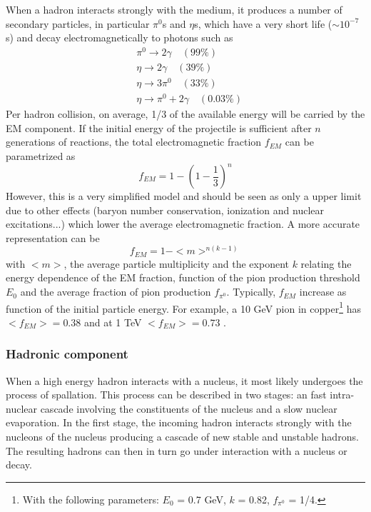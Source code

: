 When a hadron interacts strongly with the medium, it produces a number of secondary particles, in particular $\pi^0$s and $\eta$s, which have a very short life ($\sim 10^{-7}$s) and decay electromagnetically to photons such as
\begin{equation*}
  \begin{aligned}
    &\pi^0 \rightarrow 2\gamma \quad (99\%)\\
    &\eta \rightarrow 2\gamma \quad (39\%)\\
    &\eta \rightarrow 3\pi^0 \quad (33\%)\\
    &\eta \rightarrow \pi^0 + 2\gamma \quad (0.03\%)
  \end{aligned}
\end{equation*}
Per hadron collision, on average, 1/3 of the available energy will be carried by the EM component. If the initial energy of the projectile is sufficient after $n$ generations of reactions, the total electromagnetic fraction $f_{EM}$ can be parametrized as \cite{Wigmans:392793}
\begin{equation}
  f_{EM} = 1 - (1 - \frac{1}{3})^n
\end{equation}
However, this is a very simplified model and should be seen as only a upper limit due to other effects (baryon number conservation, ionization and nuclear excitations...) which lower the average electromagnetic fraction. A more accurate representation can be \cite{Wigmans:392793}
\begin{equation}
  f_{EM} = 1 - <m>^{n(k-1)}
\end{equation}
with $<m>$, the average particle multiplicity and the exponent $k$ relating the energy dependence of the EM fraction, function of the pion production threshold $E_0$ and the average fraction of pion production $f_{\pi^0}$. Typically, $f_{EM}$ increase as function of the initial particle energy. For example, a 10 GeV pion in copper\footnote{With the following parameters: $E_0$ = 0.7 GeV, $k$ = 0.82, $f_{\pi^0}$ = 1/4.} has $<f_{EM}> = 0.38$ and at 1 TeV $<f_{EM}> = 0.73$ \cite{Wigmans:392793}.

\subsubsection{Hadronic component}
\label{subsubsec:HadComp}

When a high energy hadron interacts with a nucleus, it most likely undergoes the process of spallation. This process can be described in two stages: an fast intra-nuclear cascade involving the constituents of the nucleus and a slow nuclear evaporation. In the first stage, the incoming hadron interacts strongly with the nucleons of the nucleus producing a cascade of new stable and unstable hadrons. The resulting hadrons can then in turn go under interaction with a nucleus or decay.

